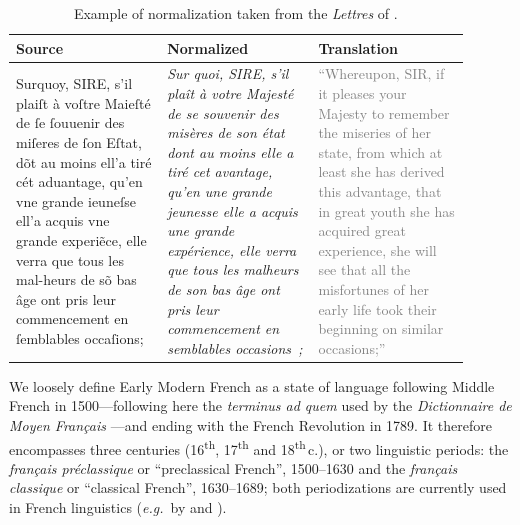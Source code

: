 \begin{table}[!htp]
    \centering\small
    \begin{tabular}{@{}p{0.3\linewidth}p{0.3\linewidth}p{0.3\linewidth}@{}}
        \toprule
        Source                                                                                                                                                                                                                                                                                               & Normalized & Translation \\
        \midrule
        Surquoy, SIRE, s’il plaiſt à voſtre Maieſté de ſe ſouuenir des miſeres de ſon Eſtat, dõt au moins ell’a tiré cét aduantage, qu’en vne grande ieuneſse ell’a acquis vne grande experi\~ece, elle verra que tous les mal-heurs de sõ bas âge ont pris leur commencement en ſemblables occaſions;       &
        \emph{Sur quoi, SIRE, s’il plaît à votre Majesté de se souvenir des misères de son état dont au moins elle a tiré cet avantage, qu’en une grande jeunesse elle a acquis une grande expérience, elle verra que tous les malheurs de son bas âge ont pris leur commencement en semblables occasions~;} &
        \textcolor{gray}{``Whereupon, SIR, if it pleases your Majesty to remember the miseries of her state, from which at least she has derived this advantage, that in great youth she has acquired great experience, she will see that all the misfortunes of her early life took their beginning on similar occasions;''}           \\
        \bottomrule
    \end{tabular}
    \caption{\label{tab:norm_examples}Example of normalization taken from the \emph{Lettres} of \protect{}.}
\end{table}

We loosely define Early Modern French as a state of language following Middle French in 1500---following here the \emph{terminus ad quem} used by the \emph{Dictionnaire de Moyen Français} \cite{martin-2020-dictionnaire}---and ending with the French Revolution in 1789. It therefore encompasses three centuries (16\textsuperscript{th}, 17\textsuperscript{th} and 18\textsuperscript{th}\,c.), or two linguistic periods: the \emph{français préclassique} or ``preclassical French'', 1500--1630 and the \emph{français classique} or ``classical French'', 1630--1689; both periodizations are currently used in French linguistics (\emph{e.g.}~by  and ).

